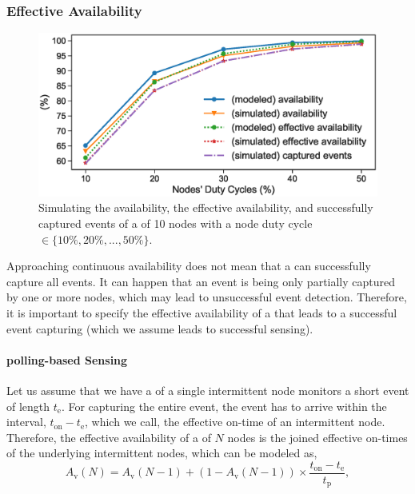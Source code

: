 \subsubsection{Effective Availability}
%
\begin{figure}
		\centering
		\includegraphics[width=\columnwidth]{figures/effective_availability}
		\caption{Simulating the availability, the effective availability, and successfully captured events of a \sys of 10 nodes with a node duty cycle $\in \{10\%, 20\%,...,50\%\}$.}
		\label{fig:cis_simulation}
\end{figure}
%
Approaching continuous availability does not mean that a \sys can successfully capture all events. It can happen that an event is being only partially captured by one or more nodes, which may lead to unsuccessful event detection. Therefore, it is important to specify the effective availability of a \sys that leads to a successful event capturing (which we assume leads to successful sensing). 

\paragraph{polling-based Sensing}
Let us assume that we have a \sys of a single intermittent node monitors a short event of length $t_\text{e}$. For capturing the entire event, the event has to arrive within the interval, $t_\text{on} - t_\text{e}$, which we call, the effective on-time of an intermittent node.
Therefore, the effective availability of a \sys of $N$ nodes is the joined effective on-times of the underlying intermittent nodes, which can be modeled as,
%
\begin{equation}
		A_\text{v}(N) = A_\text{v}(N-1) + \left(1-A_\text{v}(N-1)\right) \times \frac{t_\text{on} - t_\text{e}}{t_\text{p}},
		\label{eq:cisSenseModel}
\end{equation} 
%

